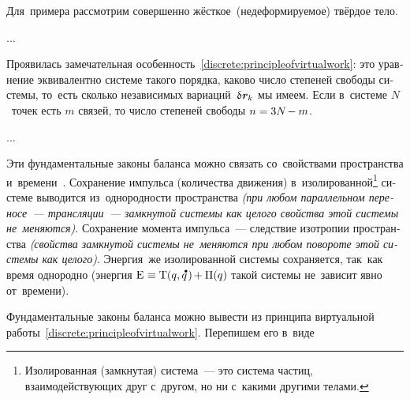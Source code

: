 \begin{otherlanguage}{russian}
Для~примера рассмотрим совершенно жёсткое~(недеформируемое) твёрдое тело.

...


Проявилась замечательная особенность~\eqref{discrete:principleofvirtualwork}: это уравнение эквивалентно системе такого порядка, каково число степеней свободы системы, то~есть сколько независимых вариаций~${\variation{\hspace{.1ex}\bm{r}_k}}$ мы имеем. Если в~системе $N$~точек есть $m$ связей, то число степеней свободы ${n = 3N \hspace{-0.25ex} - m}$.

...




Эти фундаментальные законы баланса можно связать со~свойствами пространства и~времени~\cite{landau.lifshitz-shortcourse}. Сохранение импульса (количества движения) в~изолированной\footnote{Изолированная (замкнутая) система~--- это система частиц, взаимодействующих друг с~другом, но ни с~какими другими телами.} системе выводится из~однородности пространства \emph{(при любом параллельном переносе~--- трансляции~--- замкнутой системы как целого свойства этой системы не~меняются)}. Сохранение момента импульса~--- следствие изотропии пространства \emph{(свойства замкнутой системы не~меняются при любом повороте этой системы как целого)}. Энергия~же изолированной системы сохраняется, так~как время однородно (энергия ${\mathrm{E} \hspace{.1ex} \equiv \mathrm{T}(q, \mathdotabove{q} \hspace{.2ex}) \hspace{-0.2ex} + \Pi(q)}$ такой системы не~зависит явно от~времени).

Фундаментальные законы баланса можно вывести из принципа виртуальной работы~\eqref{discrete:principleofvirtualwork}. Перепишем его в~виде


\end{otherlanguage}
